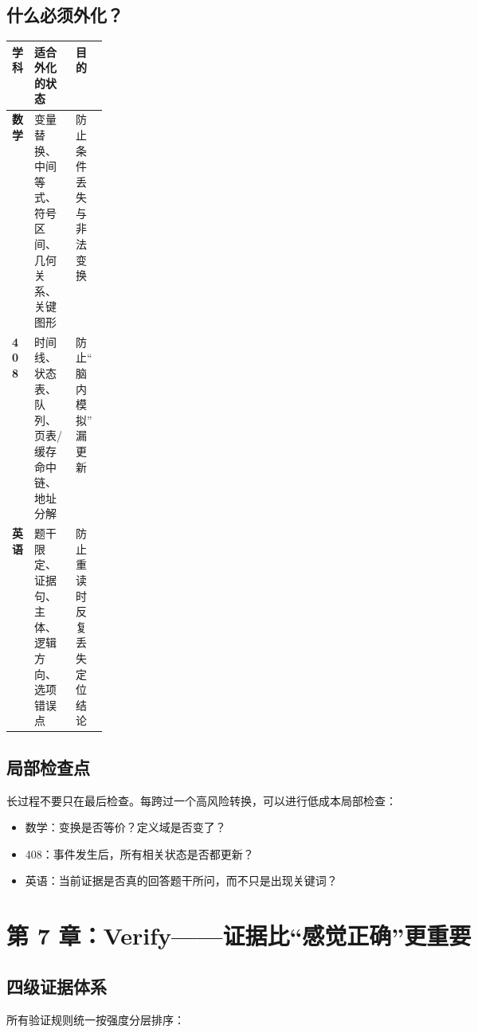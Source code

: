 \documentclass[11pt,a4paper]{ctexart}
\begin{document}
\subsection{什么必须外化？}
\begin{center}
\small
\begin{tabularx}{\linewidth}{>{\bfseries}p{0.14\linewidth} X X}
\toprule
学科 & 适合外化的状态 & 目的 \\
\midrule
数学 & 变量替换、中间等式、符号区间、几何关系、关键图形 & 防止条件丢失与非法变换 \\
408 & 时间线、状态表、队列、页表/缓存命中链、地址分解 & 防止“脑内模拟”漏更新 \\
英语 & 题干限定、证据句、主体、逻辑方向、选项错误点 & 防止重读时反复丢失定位结论 \\
\bottomrule
\end{tabularx}
\end{center}

\subsection{局部检查点}
长过程不要只在最后检查。每跨过一个高风险转换，可以进行低成本局部检查：
\begin{itemize}
  \item 数学：变换是否等价？定义域是否变了？
  \item 408：事件发生后，所有相关状态是否都更新？
  \item 英语：当前证据是否真的回答题干所问，而不只是出现关键词？
\end{itemize}

\section{第 7 章：Verify——证据比“感觉正确”更重要}

\subsection{四级证据体系}
所有验证规则统一按强度分层排序：
\end{document}
